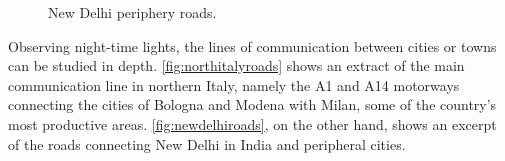 \begin{figure}
    \hspace*{-2.8cm}
    \centering
    \caption{New Delhi periphery roads.}%
    \label{fig:newdelhiroads}
\end{figure}
Observing night-time lights, the lines of communication between cities or towns can be studied in depth. \autoref{fig:northitalyroads} shows an extract of the main communication line in northern Italy, namely the A1 and A14 motorways connecting the cities of Bologna and Modena with Milan, some of the country's most productive areas. \autoref{fig:newdelhiroads}, on the other hand, shows an excerpt of the roads connecting New Delhi in India and peripheral cities.

